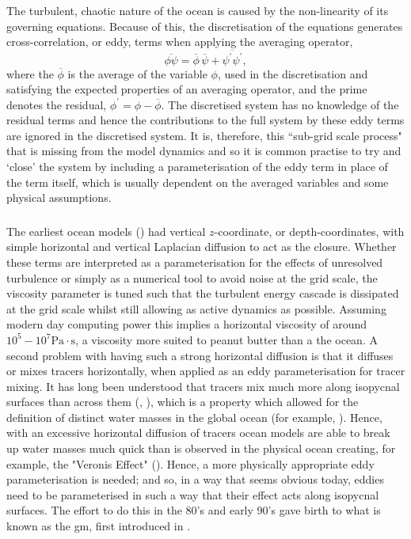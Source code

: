 \documentclass[10pt,a4paper]{report}
\newcommand*\mean[1]{\overline{#1}}
\newcommand*\res[1]{{#1}^{\prime}}
\begin{document}
 The turbulent, chaotic nature of the ocean is caused by the non-linearity of its 
 governing equations. Because of this,  the discretisation of the equations generates cross-correlation, or eddy, terms when applying the 
 averaging operator,
 \begin{equation}
 \mean{\phi\psi} = \mean{\phi}\,\mean{\psi} + 
 \mean{\res{\psi}\res{\psi}},
 \label{non-lin average}
 \end{equation}
 where the ${\mean{\phi}}$ is the average of the variable ${\phi}$, used in
 the discretisation and satisfying
 the expected properties of an averaging operator, and the prime denotes the residual, ${\phi^{\prime} = \phi - \mean{\phi}}$.
 The discretised system has no knowledge of the residual terms and hence
 the contributions to the full system by these eddy terms are
 ignored in the discretised system. It is, therefore, this ``sub-grid scale process"
 that is missing from the model dynamics and so it is common practise to try and
 `close' the system by including a parameterisation of the eddy
 term in place of the term itself, which is usually dependent on the averaged 
 variables and some physical assumptions.
 
 \subsubsection{\cite{gent1990}}
 
 The earliest ocean models (\cite{bryan1969numerical}) had vertical $z$-coordinate, or depth-coordinates, with simple horizontal and vertical Laplacian diffusion to act as 
 the closure. Whether these terms are interpreted as a parameterisation for the effects
 of unresolved turbulence or simply as a numerical tool to avoid noise at 
 the grid scale, the viscosity parameter is tuned such that the turbulent energy cascade is 
 dissipated at the grid scale whilst still allowing as active dynamics as possible. 
 Assuming modern day computing power this implies a horizontal viscosity of around 
 $10^{5} - 10^{7} \mathrm{Pa} \cdot \mathrm{s}$, a viscosity more suited to peanut butter than 
 a the ocean. A second problem with having such a strong horizontal diffusion is
 that it diffuses or mixes tracers horizontally, when applied as
 an eddy parameterisation for tracer mixing. It has long been understood that tracers 
 mix much more along isopycnal surfaces than across them (\cite{iselin1939influence}, \cite{montgomery1940present}), which is a property which allowed for the definition of
 distinct water masses in the global ocean (for example, \cite{emery1986global}).
  Hence, with an excessive horizontal diffusion
 of tracers ocean models are able to break up water masses much quick than
 is observed in the physical ocean creating, for example, the "Veronis Effect" (\cite{veronis1975role}).
 Hence, a more physically appropriate eddy parameterisation 
 is needed;
  and so, in a way that seems obvious today, eddies need to be
   parameterised in 
 such a way that their effect acts along isopycnal surfaces. 
 The effort to do this in the 80's and early 90's gave birth
 to what is known as the \gls{gm}, first introduced in \cite{gent1990}.
 
\end{document}
